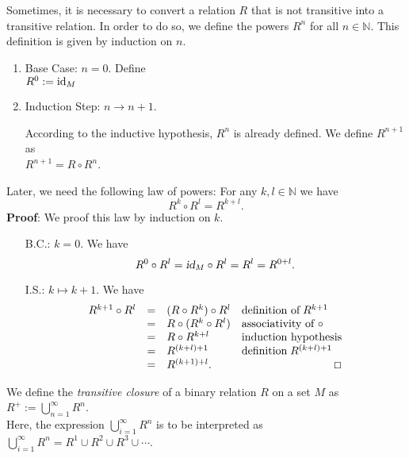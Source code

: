 Sometimes, it is necessary to convert a relation $R$ that is not transitive into a
transitive relation.  In order to do so, we define the powers $R^n$ for all
 $n \in \mathbb{N}$.  This definition is given by induction on $n$.
\begin{enumerate}
\item Base Case: $n= 0$.  Define \\[0.2cm]
      \hspace*{1.3cm} $R^0 := \textrm{id}_M$
\item Induction Step: $n \rightarrow n + 1$. 

      According to the inductive hypothesis,  $R^n$ is already defined.
      We define $R^{n+1}$ as \\[0.2cm]
      \hspace*{1.3cm} $R^{n+1} = R \circ R^n$.
\end{enumerate}
Later, we need the following law of powers: For any  $k,l \in \mathbb{N}$ we have
\[ R^k \circ R^l = R^{k+l}. \]
\textbf{Proof}:  We proof this law by induction on  $k$.
\begin{enumerate}
\item[B.C.:] $k = 0$.  We have
             \[ R^0 \circ R^l = \textsl{id}_M \circ R^l = R^l = R^{0+l}. \]
\item[I.S.:] $k \mapsto k+1$.  We have
             \[
             \begin{array}{lcll}
               R^{k+1} \circ R^l & = & (R \circ R^k) \circ R^l &
                                       \mbox{definition of}\; R^{k+1} \\
                                 & = & R \circ (R^k \circ R^l) &
                                       \mbox{associativity of $\circ$} \\
                                 & = & R \circ R^{k+l} &
                                       \mbox{induction hypothesis} \\
                                 & = & R^{(k+l)+1} &
                                       \mbox{definition}\; R^{(k+l)+1} \\
                                 & = & R^{(k+1)+l}. & \hspace*{\fill} \Box
             \end{array}
             \]
\end{enumerate}
\vspace*{0.3cm}

\noindent
We define the  \emph{transitive closure} of a binary relation $R$ on a set $M$ as \\[0.2cm]
\hspace*{1.3cm} $R^+ := \bigcup\limits_{n=1}^{\infty} R^n$. \\
Here, the expression  $\bigcup\limits_{i=1}^{\infty} R^n$ 
is to be interpreted as  \\[0.2cm]
\hspace*{1.3cm} 
$\bigcup\limits_{i=1}^{\infty} R^n = R^1 \cup R^2 \cup R^3 \cup \cdots $. 


